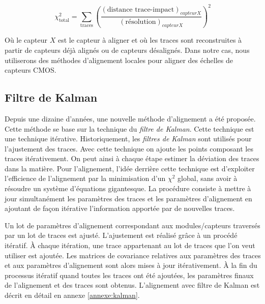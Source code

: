    \begin{equation}
    \chi^2_{\text{total}} = \sum_{\text{traces}} \left(  \dfrac{(\text{distance trace-impact})_{capteurX}}{(\text{r\'esolution})_{capteurX}} \right)^2
   \label{eq:chi2_local}
   \end{equation}   
   
   O\`u le capteur $X$ est le capteur \`a aligner et o\`u les traces sont reconstruites \`a partir de capteurs d\'ejà align\'es ou de capteurs d\'esalign\'es. Dans notre cas, nous utiliserons des m\'ethodes d'alignement locales pour aligner des \'echelles de capteurs CMOS.
   
   \subsection{Filtre de Kalman}
   \label{sect:kalman}
   
   Depuis une dizaine d'ann\'ees, une nouvelle m\'ethode d'alignement a \'et\'e propos\'ee. Cette m\'ethode se base sur la technique du \textit{filtre de Kalman}. Cette technique est une technique it\'erative. Historiquement, les \textit{filtres de Kalman} sont utilis\'es pour l'ajustement des traces. Avec cette technique on ajoute les points composant les traces it\'erativement. On peut ainsi \`a chaque \'etape estimer la d\'eviation des traces dans la mati\`ere. Pour l'alignement, l'id\'ee derri\`ere cette technique est d'exploiter l'efficience de l'alignement par la minimisation d'un $\chi^2$ global, sans avoir \`a r\'esoudre un syst\`eme d'\'equations gigantesque. La proc\'edure consiste \`a mettre \`a jour simultan\'ement les param\`etres des traces et les param\`etres d'alignement en ajoutant de fa\c{c}on it\'erative l'information apport\'ee par de nouvelles traces. 
   
   \medskip
   
   Un lot de param\`etres d'alignement correspondant aux modules/capteurs travers\'es par un lot de traces est ajust\'e. L'ajustement est r\'ealis\'e grâce \`a un proc\'ed\'e itératif. \`A chaque it\'eration, une trace appartenant au lot de traces que l'on veut utiliser est ajout\'ee. Les matrices de covariance relatives aux param\`etres des traces et aux param\`etres d'alignement sont alors mises \`a jour it\'erativement. \`A la fin du processus it\'eratif quand toutes les traces ont \'et\'e ajout\'ees, les param\`etres finaux de l'alignement et des traces sont obtenus. L'alignement avec filtre de Kalman est d\'ecrit en d\'etail en annexe \ref{annexe:kalman}.
   
